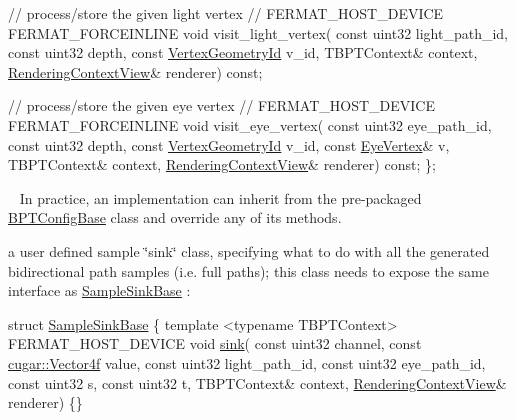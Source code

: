 \begin{DoxyParagraph}{}
\begin{DoxyEnumerate}
\begin{DoxyCode}
   \textcolor{comment}{// process/store the given light vertex}
   \textcolor{comment}{//}
   FERMAT\_HOST\_DEVICE FERMAT\_FORCEINLINE
   \textcolor{keywordtype}{void} visit\_light\_vertex(
       \textcolor{keyword}{const} uint32            light\_path\_id,
       \textcolor{keyword}{const} uint32            depth,
       \textcolor{keyword}{const} \hyperlink{struct_vertex_geometry_id}{VertexGeometryId}  v\_id,
       TBPTContext&            context,
       \hyperlink{struct_rendering_context_view}{RenderingContextView}&   renderer) \textcolor{keyword}{const};

   \textcolor{comment}{// process/store the given eye vertex}
   \textcolor{comment}{//}
   FERMAT\_HOST\_DEVICE FERMAT\_FORCEINLINE
   \textcolor{keywordtype}{void} visit\_eye\_vertex(
       \textcolor{keyword}{const} uint32            eye\_path\_id,
       \textcolor{keyword}{const} uint32            depth,
       \textcolor{keyword}{const} \hyperlink{struct_vertex_geometry_id}{VertexGeometryId}  v\_id,
       \textcolor{keyword}{const} \hyperlink{struct_eye_vertex}{EyeVertex}&        v,
       TBPTContext&            context,
       \hyperlink{struct_rendering_context_view}{RenderingContextView}&   renderer) \textcolor{keyword}{const};
\};
\end{DoxyCode}
 ~\newline
In practice, an implementation can inherit from the pre-\/packaged \hyperlink{struct_b_p_t_config_base}{B\+P\+T\+Config\+Base} class and override any of its methods. ~\newline
~\newline
\label{_b_p_t_lib_page_TSampleSink}%
%

\item a user defined sample \char`\"{}sink\char`\"{} class, specifying what to do with all the generated bidirectional path samples (i.\+e. full paths); this class needs to expose the same interface as \hyperlink{struct_sample_sink_base}{Sample\+Sink\+Base} \+: ~\newline

\begin{DoxyCodeInclude}
\textcolor{keyword}{struct }\hyperlink{struct_sample_sink_base}{SampleSinkBase}
\{
    \textcolor{keyword}{template} <\textcolor{keyword}{typename} TBPTContext>
    FERMAT\_HOST\_DEVICE
    \textcolor{keywordtype}{void} \hyperlink{struct_sample_sink_base_ab34316c125cab0da36ea2ae41e67f98f}{sink}(
        \textcolor{keyword}{const} uint32            channel,
        \textcolor{keyword}{const} \hyperlink{structcugar_1_1_vector}{cugar::Vector4f}    value,
        \textcolor{keyword}{const} uint32            light\_path\_id,
        \textcolor{keyword}{const} uint32            eye\_path\_id,
        \textcolor{keyword}{const} uint32            s,
        \textcolor{keyword}{const} uint32            t,
        TBPTContext&            context,
        \hyperlink{struct_rendering_context_view}{RenderingContextView}&   renderer)
    \{\}


\end{DoxyCodeInclude}
\end{DoxyEnumerate}
\end{DoxyParagraph}

